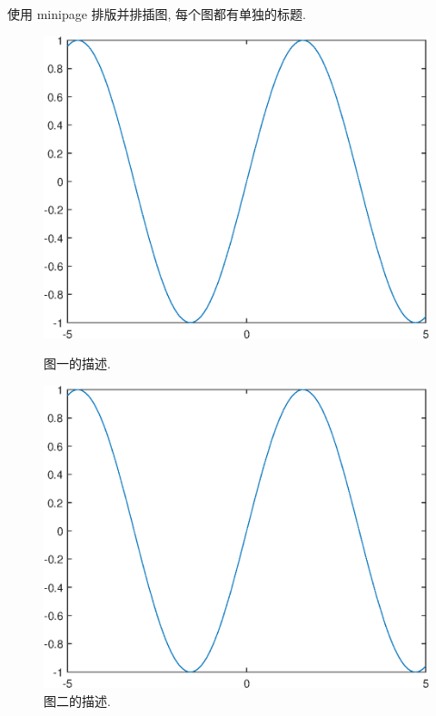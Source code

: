 \documentclass[UTF8,openany,twoside,12pt]{book}
\theoremstyle{plain}
\begin{document}
使用 minipage 排版并排插图, 每个图都有单独的标题.
\begin{figure}[htp!]
\begin{minipage}[t]{0.48\linewidth}
\centering
  \includegraphics[width=0.9\linewidth]{image1.eps}
    \caption{图一的描述.}
    \label{fig:Image1}
\end{minipage}
  \hfill
\begin{minipage}[t]{0.48\linewidth}
\centering
   \includegraphics[width=0.9\linewidth]{image1.eps}
   \caption{图二的描述.}
   \label{fig:Image2}
\end{minipage}
\end{figure}



\end{document}
